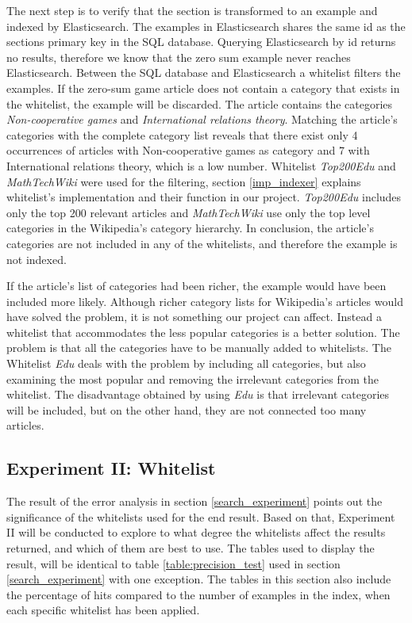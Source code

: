 The next step is to verify that the section is transformed to an example and indexed by Elasticsearch. The examples in Elasticsearch shares the same id as the sections primary key in the SQL database. Querying Elasticsearch by id returns no results, therefore we know that the zero sum example never reaches Elasticsearch. Between the SQL database and Elasticsearch a whitelist filters the examples. If the zero-sum game article does not contain a category that exists in the whitelist, the example will be discarded. The article contains the categories \textit{Non-cooperative games} and \textit{International relations theory}. Matching the article's categories with the complete category list reveals that there exist only 4 occurrences of articles with Non-cooperative games as category and 7 with International relations theory, which is a low number. Whitelist \textit{Top200Edu} and \textit{MathTechWiki} were used for the filtering, section \ref{imp_indexer} explains whitelist's implementation and their function in our project. \textit{Top200Edu} includes only the top 200 relevant articles and \textit{MathTechWiki} use only the top level categories in the Wikipedia's category hierarchy. In conclusion, the article's categories are not included in any of the whitelists, and therefore the example is not indexed.

If the article's list of categories had been richer, the example would have been included more likely. Although richer category lists for Wikipedia's articles would have solved the problem, it is not something our project can affect. Instead a whitelist that accommodates the less popular categories is a better solution. The problem is that all the categories have to be manually added to whitelists. The Whitelist \textit{Edu} deals with the problem by including all categories, but also examining the most popular and removing the irrelevant categories from the whitelist. The disadvantage obtained by using \textit{Edu} is that irrelevant categories will be included, but on the other hand, they are not connected too many articles. 

\subsection{Experiment II: Whitelist}

The result of the error analysis in section \ref{search_experiment} points out the significance of the whitelists used for the end result. Based on that, Experiment II will be conducted to explore to what degree the whitelists affect the results returned, and which of them are best to use. The tables used to display the result, will be identical to table \ref{table:precision_test} used in section \ref{search_experiment} with one exception. The tables in this section also include the percentage of hits compared to the number of examples in the index, when each specific whitelist has been applied. 

